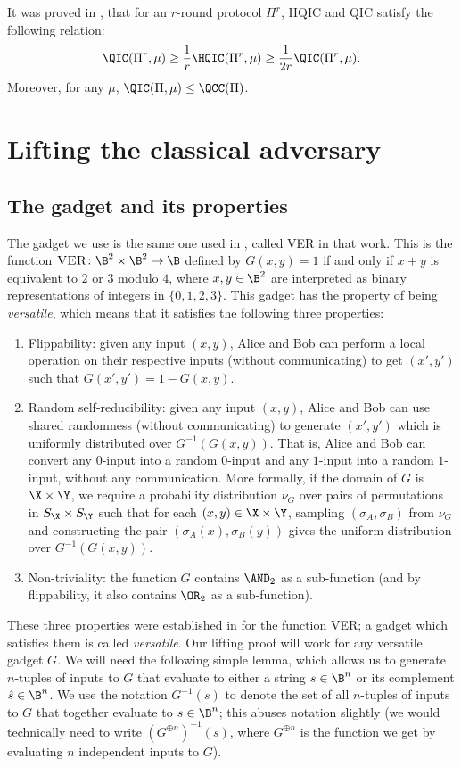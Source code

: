 It was proved in \cite{LT17}, that for an $r$-round protocol $\Pi^r$, HQIC and QIC satisfy the following relation:
\[ \QIC(\Pi^r, \mu) \geq \frac{1}{r}\HQIC(\Pi^r, \mu) \geq \frac{1}{2r}\QIC(\Pi^r,\mu).\]
Moreover, for any $\mu$, $\QIC(\Pi,\mu) \leq \QCC(\Pi)$.

\section{Lifting the classical adversary}

\subsection{The gadget and its properties}

The gadget we use is the same one used in \cite{GP18},
called \textsc{VER} in that work. This is the function
$\textsc{VER}\colon\B^2\times\B^2\to\B$ defined by $G(x,y)=1$
if and only if $x+y$ is equivalent to $2$ or $3$ modulo $4$,
where $x,y\in\B^2$ are interpreted as binary representations
of integers in $\{0,1,2,3\}$. This gadget has the property
of being \emph{versatile}, which means that it satisfies
the following three properties:
\begin{enumerate}
\item Flippability: given any input $(x,y)$, Alice
and Bob can perform a local operation on their respective inputs (without communicating)
to get $(x',y')$ such that $G(x',y')=1-G(x,y)$.
\item Random self-reducibility: given any input $(x,y)$,
Alice and Bob can use shared randomness (without communicating)
to generate $(x',y')$ which is uniformly distributed over
$G^{-1}(G(x,y))$. That is, Alice and Bob can convert any $0$-input
into a random $0$-input and any $1$-input into a random $1$-input,
without any communication. More formally,
if the domain of $G$ is $\X\times \Y$,
we require a probability distribution $\nu_G$
over pairs of permutations in $S_{\X}\times S_{\Y}$
such that for each $(x,y)\in\X\times\Y$,
sampling $(\sigma_A,\sigma_B)$ from $\nu_G$
and constructing the pair $(\sigma_A(x),\sigma_B(y))$
gives the uniform distribution over $G^{-1}(G(x,y))$.
\item Non-triviality: the function $G$ contains $\AND_2$
as a sub-function (and by flippability, it also contains
$\OR_2$ as a sub-function).
\end{enumerate}

These three properties were established in \cite{GP18} for
the function \textsc{VER}; a gadget which satisfies
them is called \emph{versatile}.
Our lifting proof will work for any versatile gadget $G$.
We will need the following simple lemma, which allows
us to generate $n$-tuples of inputs to $G$ that evaluate
to either a string $s\in\B^n$ or its complement
$\hat{s}\in\B^n$. We use the notation $G^{-1}(s)$
to denote the set of all $n$-tuples of inputs to $G$
that together evaluate to $s\in\B^n$; this abuses
notation slightly (we would technically need to write
$(G^{\oplus n})^{-1}(s)$, where $G^{\oplus n}$ is
the function we get by evaluating $n$ independent inputs
to $G$).

